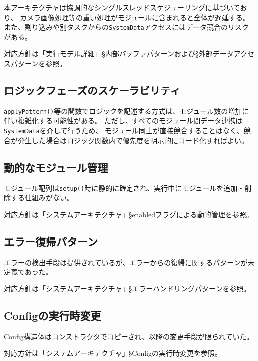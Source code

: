 本アーキテクチャは協調的なシングルスレッドスケジューリングに基づいており、
カメラ画像処理等の重い処理がモジュールに含まれると全体が遅延する。
また、割り込みや別タスクからの\texttt{SystemData}アクセスにはデータ競合のリスクがある。

対応方針は「実行モデル詳細」§内部バッファパターンおよび§外部データアクセスパターンを参照。

\subsection{ロジックフェーズのスケーラビリティ}

\texttt{applyPattern()}等の関数でロジックを記述する方式は、モジュール数の増加に伴い複雑化する可能性がある。
ただし、すべてのモジュール間データ連携は\texttt{SystemData}を介して行うため、
モジュール同士が直接競合することはなく、競合が発生した場合はロジック関数内で優先度を明示的にコード化すればよい。

\subsection{動的なモジュール管理}

モジュール配列は\texttt{setup()}時に静的に確定され、実行中にモジュールを追加・削除する仕組みがない。

対応方針は「システムアーキテクチャ」§enabledフラグによる動的管理を参照。

\subsection{エラー復帰パターン}

エラーの検出手段は提供されているが、エラーからの復帰に関するパターンが未定義であった。

対応方針は「システムアーキテクチャ」§エラーハンドリングパターンを参照。

\subsection{Configの実行時変更}

Config構造体はコンストラクタでコピーされ、以降の変更手段が限られていた。

対応方針は「システムアーキテクチャ」§Configの実行時変更を参照。

